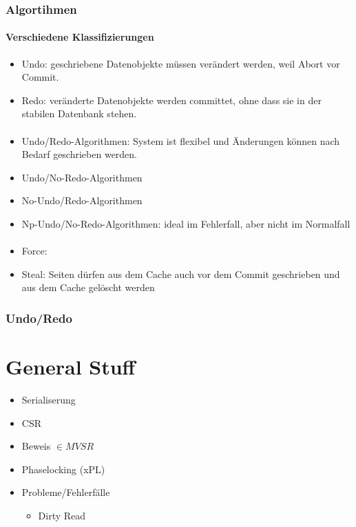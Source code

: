 \documentclass[ngerman]{scrartcl}
\begin{document}
\subsubsection{Algortihmen}
\paragraph{Verschiedene Klassifizierungen}

\begin{itemize}
  \item Undo: geschriebene Datenobjekte müssen verändert werden, weil Abort vor Commit. 
  \item Redo: veränderte Datenobjekte werden committet, ohne dass sie in der stabilen Datenbank stehen.
\end{itemize}
\paragraph{}
\begin{itemize}
  \item Undo/Redo-Algorithmen: System ist flexibel und Änderungen können nach Bedarf geschrieben werden.
  \item Undo/No-Redo-Algorithmen 
  \item No-Undo/Redo-Algorithmen
  \item Np-Undo/No-Redo-Algorithmen: ideal im Fehlerfall, aber nicht im Normalfall
\end{itemize}
\paragraph{}
\begin{itemize}
  \item Force: 
  \item Steal: Seiten dürfen aus dem Cache auch vor dem Commit geschrieben und aus dem Cache gelöscht werden
\end{itemize}

\subsubsection{Undo/Redo}


  











%
%
%
%

\section{General Stuff}
\begin{itemize}
  \item Serialiserung
  \item CSR
  \item Beweis $ \in MVSR $
  \item Phaselocking (xPL)
  \item Probleme/Fehlerfälle
  \begin{itemize}
    \item Dirty Read
  \end{itemize}
\end{itemize}
\end{document}
